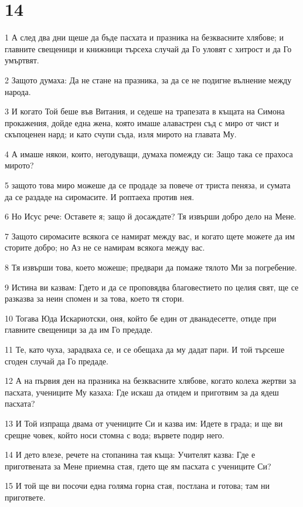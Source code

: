 \chapter{14}

\par 1 А след два дни щеше да бъде пасхата и празника на безквасните хлябове; и главните свещеници и книжници търсеха случай да Го уловят с хитрост и да Го умъртвят.
\par 2 Защото думаха: Да не стане на празника, за да се не подигне вълнение между народа.
\par 3 И когато Той беше във Витания, и седеше на трапезата в къщата на Симона прокажения, дойде една жена, която имаше алавастрен съд с миро от чист и скъпоценен нард; и като счупи съда, изля мирото на главата Му.
\par 4 А имаше някои, които, негодуващи, думаха помежду си: Защо така се прахоса мирото?
\par 5 защото това миро можеше да се продаде за повече от триста пеняза, и сумата да се раздаде на сиромасите. И роптаеха против нея.
\par 6 Но Исус рече: Оставете я; защо й досаждате? Тя извърши добро дело на Мене.
\par 7 Защото сиромасите всякога се намират между вас, и когато щете можете да им сторите добро; но Аз не се намирам всякога между вас.
\par 8 Тя извърши това, което можеше; предвари да помаже тялото Ми за погребение.
\par 9 Истина ви казвам: Гдето и да се проповядва благовестието по целия свят, ще се разказва за неин спомен и за това, което тя стори.
\par 10 Тогава Юда Искариотски, оня, който бе един от дванадесетте, отиде при главните свещеници за да им Го предаде.
\par 11 Те, като чуха, зарадваха се, и се обещаха да му дадат пари. И той търсеше сгоден случай да Го предаде.
\par 12 А на първия ден на празника на безквасните хлябове, когато колеха жертви за пасхата, учениците Му казаха: Где искаш да отидем и приготвим за да ядеш пасхата?
\par 13 И Той изпраща двама от учениците Си и казва им: Идете в града; и ще ви срещне човек, който носи стомна с вода; вървете подир него.
\par 14 И дето влезе, речете на стопанина тая къща: Учителят казва: Где е приготвената за Мене приемна стая, гдето ще ям пасхата с учениците Си?
\par 15 И той ще ви посочи една голяма горна стая, постлана и готова; там ни пригответе.
